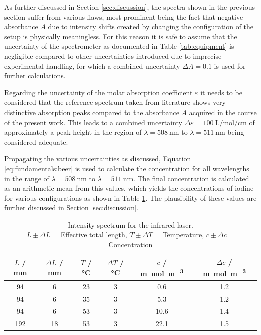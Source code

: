 As further discussed in Section \ref{sec:discussion}, the spectra shown in the previous section suffer from various flaws, most prominent being the fact that negative absorbance $A$ due to intensity shifts created by changing the configuration of the setup is physically meaningless. For this reason it is safe to assume that the uncertainty of the spectrometer as documented in Table \ref{tab:equipment} is negligible compared to other uncertainties introduced due to imprecise experimental handling, for which a combined uncertainty $\Delta A = 0.1$ is used for further calculations.

Regarding the uncertainty of the molar absorption coefficient $\varepsilon$ it needs to be considered that the reference spectrum taken from literature \cite{Iodine} shows very distinctive absorption peaks compared to the absorbance $A$ acquired in the course of the present work. This leads to a combined uncertainty $\Delta \varepsilon = \SI{100}{\L\per\mol\per\cm}$ of approximately a peak height in the region of $\lambda = \SI{508}{\nm}$ to $\lambda = \SI{511}{\nm}$ being considered adequate.

Propagating the various uncertainties as discussed, Equation \ref{eq:fundamentals:beer} is used to calculate the concentration for all wavelengths in the range of $\lambda = \SI{508}{\nm}$ to $\lambda = \SI{511}{\nm}$. The final concentration is calculated as an arithmetic mean from this values, which yields the concentrations of iodine for various configurations as shown in Table \ref{tab:evaluation:concentration}. The plausibility of these values are further discussed in Section \ref{sec:discussion}.

\begin{table}[H]
    \centering
    \caption{Intensity spectrum for the infrared laser. \\
    $L \pm \Delta L$ = Effective total length, $T \pm \Delta T$ = Temperature, $c \pm \Delta c$ = Concentration}
    \label{tab:evaluation:concentration}
    \begin{tabular}{cccccc}
    \hline
    $L$ / mm & $\Delta L$ / mm & $T$ / \si{\celsius} & $\Delta T$ / \si{\celsius} & $c$ / \si{\m\mol\per\m^3} & $\Delta c$ / \si{\m\mol\per\m^3} \\ \hline
    94 & 6 & 23 & 3 & 0.6 & 1.2 \\
    94 & 6 & 35 & 3 & 5.3 & 1.2 \\
    94 & 6 & 53 & 3 & 10.6 & 1.4 \\
    192 & 18 & 53 & 3 & 22.1 & 1.5 \\ \hline
    \end{tabular}
\end{table}